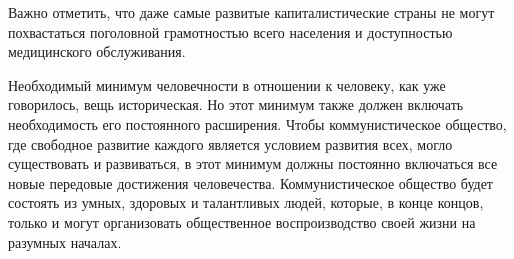 \documentclass[../main]{subfiles}
\begin{document}
Важно отметить, что даже самые развитые капиталистические страны не могут похвастаться поголовной грамотностью всего населения и доступностью медицинского обслуживания.

Необходимый минимум человечности в отношении к человеку, как уже говорилось, вещь историческая. Но этот минимум также должен включать необходимость его постоянного расширения. Чтобы коммунистическое общество, где свободное развитие каждого является условием развития всех, могло существовать и развиваться, в этот минимум должны постоянно включаться все новые передовые достижения человечества. Коммунистическое общество будет состоять из умных, здоровых и талантливых людей, которые, в конце концов, только и могут организовать общественное воспроизводство своей жизни на разумных началах.
\end{document}

